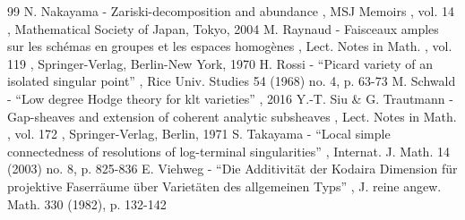 \documentclass[11pt]{article}
\theoremstyle{plain}
\theoremstyle{definition}
\numberwithin{equation}{thm}
\numberwithin{enumi}{thm}
\begin{document}
\begin{thebibliography}{99}
 N. Nakayama - Zariski-decomposition and abundance , MSJ Memoirs , vol. 14 , Mathematical Society of Japan, Tokyo, 2004
 M. Raynaud - Faisceaux amples sur les schémas en groupes et les espaces homogènes , Lect. Notes in Math. , vol. 119 , Springer-Verlag, Berlin-New York, 1970
 H. Rossi - “Picard variety of an isolated singular point” , Rice Univ. Studies 54 (1968) no. 4, p. 63-73
 M. Schwald - “Low degree Hodge theory for klt varieties” , 2016
 Y.-T. Siu \& G. Trautmann - Gap-sheaves and extension of coherent analytic subsheaves , Lect. Notes in Math. , vol. 172 , Springer-Verlag, Berlin, 1971
 S. Takayama - “Local simple connectedness of resolutions of log-terminal singularities” , Internat. J. Math. 14 (2003) no. 8, p. 825-836
 E. Viehweg - “Die Additivität der Kodaira Dimension für projektive Faserräume über Varietäten des allgemeinen Typs” , J. reine angew. Math. 330 (1982), p. 132-142
\end{thebibliography}
\end{document}
